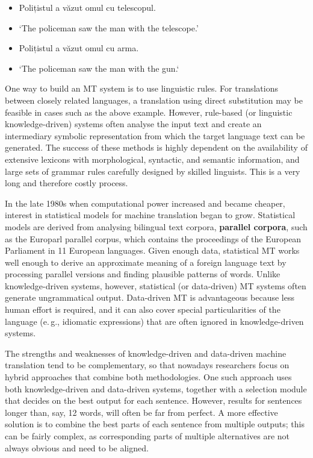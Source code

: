 \documentclass[]{../../metanetpaper}
\begin{document}
\begin{multicols}{2}
\begin{example}
\begin{itemize}
\item []Polițistul a văzut omul cu telescopul.
\item []`The policeman saw the man with the telescope.'
\end{itemize}
\end{example}

\begin{example}
\begin{itemize}
\item []Polițistul a văzut omul cu arma.
\item []`The policeman saw the man with the gun.`
\end{itemize}
\end{example}

One way to build an MT system is to use linguistic rules. For translations between closely related languages, a translation using direct substitution may be feasible in cases such as the above example. However, rule-based (or linguistic knowledge-driven) systems often analyse the input text and create an intermediary symbolic representation from which the target language text can be generated. The success of these methods is highly dependent on the availability of extensive lexicons with morphological, syntactic, and semantic information, and large sets of grammar rules carefully designed by skilled linguists. This is a very long and therefore costly process.

In the late 1980s when computational power increased and became cheaper, interest in statistical models for machine translation began to grow. Statistical models are derived from analysing bilingual text corpora, \textbf{parallel corpora}, such as the Europarl parallel corpus, which contains the proceedings of the European Parliament in 11 European languages. Given enough data, statistical MT works well enough to derive an approximate meaning of a foreign language text by processing parallel versions and finding plausible patterns of words. Unlike knowledge-driven systems, however, statistical (or data-driven) MT systems often generate ungrammatical output. Data-driven MT is advantageous because less human effort is required, and it can also cover special particularities of the language (e.\,g., idiomatic expressions) that are often ignored in knowledge-driven systems. 

The strengths and weaknesses of knowledge-driven and data-driven machine translation tend to be complementary, so that nowadays researchers focus on hybrid approaches that combine both methodologies. One such approach uses both knowledge-driven and data-driven systems, together with a selection module that decides on the best output for each sentence. However, results for sentences longer than, say, 12 words, will often be far from perfect. A more effective solution is to combine the best parts of each sentence from multiple outputs; this can be fairly complex, as corresponding parts of multiple alternatives are not always obvious and need to be aligned. 


\end{multicols}
\end{document}
